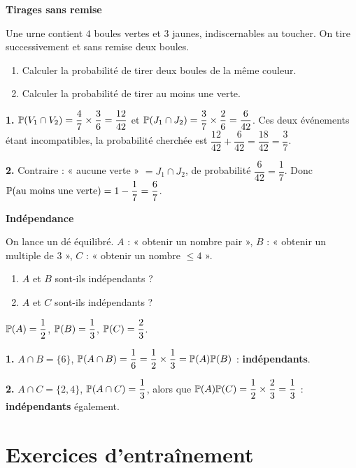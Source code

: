 \exerciceresolu
\textbf{Tirages sans remise}

Une urne contient $4$ boules vertes et $3$ jaunes, indiscernables au toucher.
On tire successivement et sans remise deux boules.
\begin{enumerate}
	\item Calculer la probabilité de tirer deux boules de la même couleur.
	\item Calculer la probabilité de tirer au moins une verte.
\end{enumerate}

\solution

\textbf{1.} $\mathbb{P}(V_1\cap V_2)=\dfrac47\times\dfrac36=\dfrac{12}{42}$ et
$\mathbb{P}(J_1\cap J_2)=\dfrac37\times\dfrac26=\dfrac{6}{42}$. Ces deux événements
étant incompatibles, la probabilité cherchée est
$\dfrac{12}{42}+\dfrac{6}{42}=\dfrac{18}{42}=\dfrac37$.

\textbf{2.} Contraire : « aucune verte » $=J_1\cap J_2$, de probabilité
$\dfrac{6}{42}=\dfrac17$. Donc $\mathbb{P}(\text{au moins une verte})
=1-\dfrac17=\dfrac67$.

\exerciceresolu
\textbf{Indépendance}

On lance un dé équilibré. $A$ : « obtenir un nombre pair », $B$ : « obtenir
un multiple de $3$ », $C$ : « obtenir un nombre $\leqslant 4$ ».
\begin{enumerate}
	\item $A$ et $B$ sont-ils indépendants ?
	\item $A$ et $C$ sont-ils indépendants ?
\end{enumerate}

\solution

$\mathbb{P}(A)=\dfrac12$, $\mathbb{P}(B)=\dfrac13$, $\mathbb{P}(C)=\dfrac23$.

\textbf{1.} $A\cap B=\{6\}$, $\mathbb{P}(A\cap B)=\dfrac16=\dfrac12\times\dfrac13
=\mathbb{P}(A)\mathbb{P}(B)$ : \textbf{indépendants}.

\textbf{2.} $A\cap C=\{2,4\}$, $\mathbb{P}(A\cap C)=\dfrac13$, alors que
$\mathbb{P}(A)\mathbb{P}(C)=\dfrac12\times\dfrac23=\dfrac13$ : \textbf{indépendants}
également.


\section{Exercices d'entraînement}

